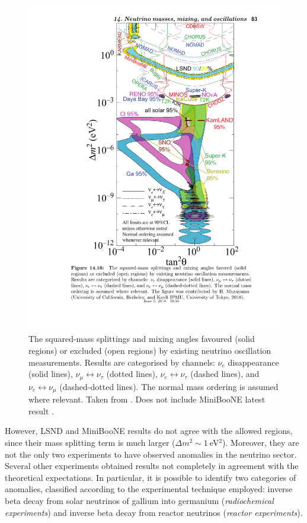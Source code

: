 \begin{figure}[htbp]
    \centering
    \includegraphics[width=0.7\linewidth]{figures/globalfit.pdf}
    \caption{The squared-mass splittings and mixing angles favoured (solid regions) or excluded (open regions) by existing neutrino oscillation measurements. Results are categorised by channels: $\nu_e$ disappearance (solid lines), $\nu_{\mu} \leftrightarrow \nu_{\tau}$  (dotted lines), $\nu_{e} \leftrightarrow \nu_{\tau}$ (dashed lines), and $\nu_{e} \leftrightarrow \nu_{\mu}$ (dashed-dotted lines). The normal mass ordering is assumed where relevant. Taken from \cite{PhysRevD.98.030001}. Does not include MiniBooNE latest result \cite{Aguilar-Arevalo:2018gpe}.}
    \label{fig:globalfit}
\end{figure}

However, LSND and MiniBooNE results do not agree with the allowed regions, since their mass splitting term is much larger ($\Delta m^2 \sim 1~$eV$^2$). Moreover, they are not the only two experiments to have observed anomalies in the neutrino sector. Several other experiments obtained results not completely in agreement with the theoretical expectations. In particular, it is possible to identify two categories of anomalies, classified according to the experimental technique employed: inverse beta decay from solar neutrinos of gallium into germanium (\emph{radiochemical experiments}) and inverse beta decay from reactor neutrinos (\emph{reactor experiments}).

